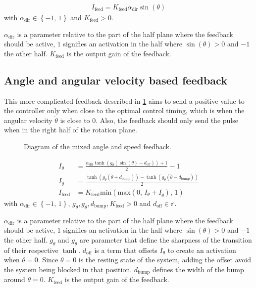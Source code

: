 \begin{align}
    I_\text{feed} = K_\text{feed}\alpha_\text{dir}\sin\left(\theta\right)
\end{align}
with $\alpha_\text{dir} \in \left\{-1,\,1\right\}$ and $K_\text{feed} > 0$.

$\alpha_\text{dir}$ is a parameter relative to the part of the half plane where the feedback should be active, $1$ signifies an activation in the half where $\sin\left(\theta\right)>0$ and $-1$ the other half. 
$K_\text{feed}$ is the output gain of the feedback.

\subsection{Angle and angular velocity based feedback}\label{sec:speed_feed}

This more complicated feedback described in \cref{fig:speed_angle} aims to send a positive value to the controller only when close to the optimal control timing, which is when the angular velocity $\dot{\theta}$ is close to $0$. 
Also, the feedback should only send the pulse when in the right half of the rotation plane.

\begin{figure}[!htb]
    \centering
    \caption{Diagram of the mixed angle and speed feedback.}
    \label{fig:speed_angle}
\end{figure}

\begin{align}
    I_\theta &= \frac{\alpha_\text{dir}\tanh\left(g_\theta\left(\sin\left(\theta\right)-d_\text{off}\right)\right) + 1}{2} - 1\label{eq:speed_theta}\\
    I_{\dot{\theta}} &= \frac{\tanh\left(g_{\dot{\theta}}\left(\dot{\theta}+d_\text{bump}\right)\right) -\tanh\left(g_{\dot{\theta}}\left(\dot{\theta}-d_\text{bump}\right)\right)}{2}\label{eq:speed_bump}\\
    I_\text{feed} &= K_\text{feed}\text{min}\left(\text{max}\left(0,\, I_\theta + I_{\dot{\theta}}\right),\, 1\right)
\end{align}
with $\alpha_\text{dir} \in \left\{-1,\,1\right\}$, $g_\theta, g_{\dot{\theta}}, d_\text{bump}, K_\text{feed} > 0$ and $d_\text{off} \in \mathbb{r}$.

$\alpha_\text{dir}$ is a parameter relative to the part of the half plane where the feedback should be active, $1$ signifies an activation in the half where $\sin\left(\theta\right)>0$ and $-1$ the other half. 
$g_\theta$ and $g_{\dot{\theta}}$ are parameter that define the sharpness of the transition of their respective $\tanh$.
$d_\text{off}$ is a term that offsets $I_\theta$ to create an activation when $\theta = 0$. Since $\theta = 0$ is the resting state of the system, adding the offset avoid the system being blocked in that position.
$d_\text{bump}$ defines the width of the bump around $\dot{\theta} = 0$. 
$K_\text{feed}$ is the output gain of the feedback.

